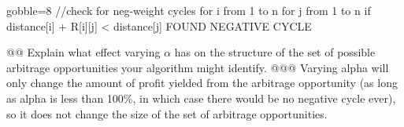 \documentclass[10pt]{article}\usepackage[]{graphicx}\usepackage[]{xcolor}
\begin{document}
\begin{easylist}[enumerate]
\begin{pythoncode*}{gobble=8}
{          //check for neg-weight cycles
          for i from 1 to n {
            for j from 1 to n {
              if distance[i] + R[i][j] < distance[j]
                FOUND NEGATIVE CYCLE
            }
          }
        }
    \end{pythoncode*}

    @@ Explain what effect varying $\alpha$ has on the structure of the set of possible arbitrage opportunities your
    algorithm might identify.
    @@@ Varying alpha will only change the amount of profit yielded from the arbitrage opportunity (as long as alpha is
    less than 100\%, in which case there would be no negative cycle ever), so it does not change the size of the set of
    arbitrage opportunities.
\end{easylist}
\end{document}
